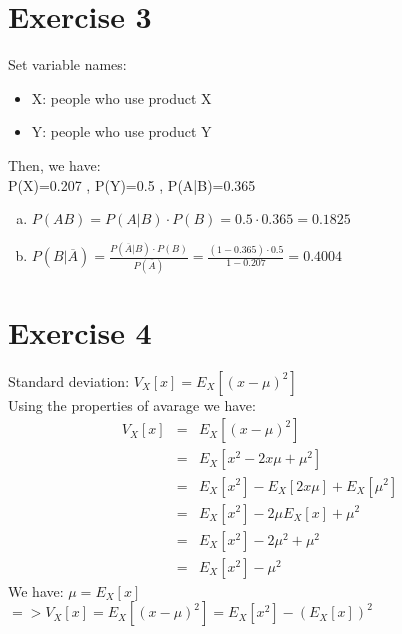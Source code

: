 \documentclass{article}
\begin{document}
\section{Exercise 3}
Set variable names: \begin{itemize}
    \item X: people who use product X
    \item Y: people who use product Y
\end{itemize}
Then, we have:\\
P(X)=0.207   ,  P(Y)=0.5   ,  P(A|B)=0.365
\begin{enumerate}[a)]
    \item $P(AB) = P(A|B)\cdot P(B) = 0.5 \cdot 0.365 = 0.1825$
    \item $P(B|\overline{A}) = \frac{P(\overline{A}|B) \cdot P(B)}{P(\overline{A})} = \frac{(1-0.365) \cdot 0.5}{1 - 0.207} = 0.4004$
\end{enumerate}




\section{Exercise 4}
Standard deviation:
$V_X[x] = E_X[(x-\mu)^2]$\\
Using the properties of avarage we have:\\
\begin{eqnarray*}
V_X[x] & = & E_X[(x-\mu)^2] \\
& = & E_X[x^2 - 2x\mu + \mu^2]\\
& = & E_X[x^2] - E_X[2x\mu] + E_X[\mu^2]\\
& = & E_X[x^2] -2\mu E_X[x] + \mu^2\\                
& = & E_X[x^2] -2\mu^2 + \mu^2\\
& = & E_X[x^2] - \mu^2
\end{eqnarray*}
We have: $\mu = E_X[x]$ \\
 $ => V_X[x]  =  E_X[(x-\mu)^2]  =  E_X[x^2] -(E_X[x])^2 $

\end{document}
